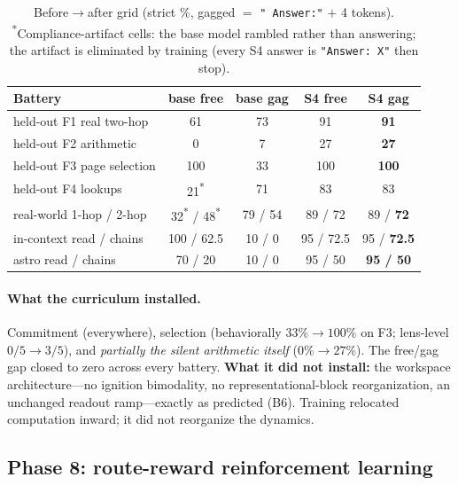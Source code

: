 \documentclass[11pt]{article}
\newcommand{\pct}{\%}
\begin{document}
\begin{table}[h]
\centering
\small
\renewcommand{\arraystretch}{1.2}
\begin{tabular}{@{}lcccc@{}}
\toprule
\textbf{Battery} & \textbf{base free} & \textbf{base gag} & \textbf{S4 free} & \textbf{S4 gag} \\
\midrule
held-out F1 real two-hop      & 61 & 73 & 91 & \textbf{91} \\
held-out F2 arithmetic        & 0  & 7  & 27 & \textbf{27} \\
held-out F3 page selection    & 100 & 33 & 100 & \textbf{100} \\
held-out F4 lookups           & 21\textsuperscript{*} & 71 & 83 & 83 \\
real-world 1-hop / 2-hop      & 32\textsuperscript{*} / 48\textsuperscript{*} & 79 / 54 & 89 / 72 & 89 / \textbf{72} \\
in-context read / chains      & 100 / 62.5 & 10 / 0 & 95 / 72.5 & 95 / \textbf{72.5} \\
astro read / chains           & 70 / 20 & 10 / 0 & 95 / 50 & \textbf{95 / 50} \\
\bottomrule
\end{tabular}
\caption{Before$\to$after grid (strict \%, gagged $=$ \texttt{"~Answer:"} $+$ 4
tokens). \textsuperscript{*}Compliance-artifact cells: the base model rambled
rather than answering; the artifact is eliminated by training (every S4 answer is
\texttt{"Answer: X"} then stop).}
\label{tab:grid}
\end{table}

\paragraph{What the curriculum installed.} Commitment (everywhere), selection
(behaviorally $33\pct{\to}100\pct$ on F3; lens-level $0/5{\to}3/5$), and
\emph{partially the silent arithmetic itself} ($0\pct{\to}27\pct$). The free/gag
gap closed to zero across every battery. \textbf{What it did not install:} the
workspace architecture---no ignition bimodality, no representational-block
reorganization, an unchanged readout ramp---exactly as predicted (B6). Training
relocated computation inward; it did not reorganize the dynamics.

\subsection{Phase 8: route-reward reinforcement learning}
\end{document}

